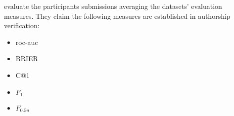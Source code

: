 \citet{zangerle_overview_nodate} evaluate the participants submissions averaging the datasets' evaluation measures.
They claim the following measures are established in authorship verification:
\begin{itemize}
    \item \ac{roc-auc}
    \item BRIER
    \item C@1
    \item $F_1$
    \item $F_{0.5u}$
\end{itemize}